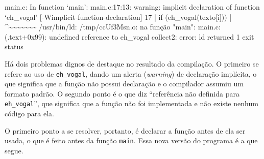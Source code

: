 \documentclass[
  11pt,
  a4paper,
]{scrbook}
\newenvironment{Shaded}{\begin{snugshade}}{\end{snugshade}}
\newcommand{\NormalTok}[1]{#1}
\begin{document}
\begin{Shaded}
\begin{Highlighting}[]
\NormalTok{main.c: In function ‘main’:}
\NormalTok{main.c:17:13: warning: implicit declaration of function ‘eh\_vogal’ }
\NormalTok{[{-}Wimplicit{-}function{-}declaration]}
\NormalTok{   17 |         if (eh\_vogal(texto[i]))}
\NormalTok{      |             \^{}\textasciitilde{}\textasciitilde{}\textasciitilde{}\textasciitilde{}\textasciitilde{}\textasciitilde{}\textasciitilde{}}
\NormalTok{/usr/bin/ld: /tmp/ccUf3Msn.o: na função "main":}
\NormalTok{main.c:(.text+0x99): undefined reference to \textasciigrave{}eh\_vogal\textquotesingle{}}
\NormalTok{collect2: error: ld returned 1 exit status}
\end{Highlighting}
\end{Shaded}

Há dois problemas dignos de destaque no resultado da compilação. O
primeiro se refere ao uso de \texttt{eh\_vogal}, dando um alerta
(\emph{warning}) de declaração implícita, o que significa que a função
não possui declaração e o compilador assumiu um formato padrão. O
segundo ponto é o que diz ``referência não definida para
\texttt{eh\_vogal}'', que significa que a função não foi implementada e
não existe nenhum código para ela.

O primeiro ponto a se resolver, portanto, é declarar a função antes de
ela ser usada, o que é feito antes da função \texttt{main}. Essa nova
versão do programa é a que segue.
\end{document}
